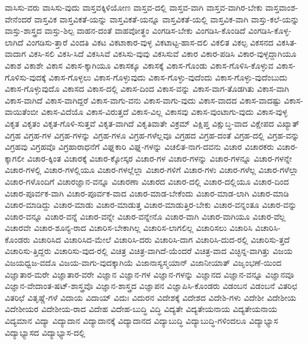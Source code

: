 {ವಾಸಿಸು-ವರು
ವಾಸಿಸು-ವುದು
ವಾಸ್ತವಕ್ಕಿಳಿಯೋಣ
ವಾಸ್ತವ-ದಲ್ಲಿ
ವಾಸ್ತವ-ವಾಗಿ
ವಾಸ್ತವ-ವಾಗಿರ-ಬೇಕು
ವಾಸ್ತವಾಂಶ-ವೇನೆಂದರೆ
ವಾಸ್ತವಿಕ
ವಾಸ್ತವಿಕತೆ-ಯನ್ನು
ವಾಸ್ತವಿಕತೆ-ಯನ್ನೂ
ವಾಸ್ತವಿಕತೆ-ಯಲ್ಲಿ
ವಾಸ್ತವಿಕ-ವಾಗಿ
ವಾಸ್ತು-ಕಲೆ-ಯನ್ನು
ವಾಸ್ತು-ಶಾಸ್ತ್ರದ
ವಾಸ್ತು-ಶಿಲ್ಪ
ವಾಹನ-ದಂತೆ
ವಾಹವೋತ್ಥಂ
ವಿಂಗಡಿಸ-ಬೇಕು
ವಿಂಗಡಿಸಿ-ಕೊಂಡಿದೆ
ವಿಂಗಡಿಸಿ-ಕೊಳ್ಳ-ಲಾಗಿದೆ
ವಿಂಗಡಿಸು-ತ್ತಾರೆ
ವಿಂದತಿ
ವಿಕಟ
ವಿಕಟಾಕಾರ-ವುಳ್ಳ
ವಿಕಟಾಟ್ಟ-ಹಾಸ-ದಲಿ
ವಿಕಲಿತ
ವಿಕಲ್ಪ
ವಿಕಸನದ
ವಿಕಸಿತ-ವಾದಾಗ
ವಿಕಸಿ-ಸಲಿ
ವಿಕಸಿ-ಸಿದೆ
ವಿಕಸಿಸಿವೆ
ವಿಕಸಿಸು-ವುವು
ವಿಕಸಿಸುವೆ
ವಿಕಾರ
ವಿಕಾರ-ಪಡಿಸಿ
ವಿಕಾರ-ವುಳ್ಳದ್ದಾಗಿಯೂ
ವಿಕಾಶ
ವಿಕಾಶೇ
ವಿಕಾಸ
ವಿಕಾಸ-ಕ್ಕಾಗಿಯೂ
ವಿಕಾಸಕ್ಕೂ
ವಿಕಾಸಕ್ಕೆ
ವಿಕಾಸ-ಗೊಂಡು
ವಿಕಾಸ-ಗೊಳಿಸಿ-ಕೊಳ್ಳುವ
ವಿಕಾಸ-ಗೊಳಿಸು-ವುದಕ್ಕೆ
ವಿಕಾಸ-ಗೊಳ್ಳಲು
ವಿಕಾಸ-ಗೊಳ್ಳುವುದು
ವಿಕಾಸ-ಗೊಳ್ಳು-ವುದೆಂದು
ವಿಕಾಸ-ಗೊಳ್ಳು-ವುದೆಂಬುದು
ವಿಕಾಸ-ಗೊಳ್ಳುವುದೊ
ವಿಕಾಸದ
ವಿಕಾಸ-ದಲ್ಲಿ
ವಿಕಾಸ-ದಿಂದ
ವಿಕಾಸ-ವನ್ನು
ವಿಕಾಸ-ವಾಗ-ತೊಡಗಿತು
ವಿಕಾಸ-ವಾಗಿ
ವಿಕಾಸ-ವಾಗಿದೆ
ವಿಕಾಸ-ವಾಗಿದ್ದರೆ
ವಿಕಾಸ-ವಾಗು-ವನು
ವಿಕಾಸ-ವಾಗು-ವುದು
ವಿಕಾಸ-ವಾದದ
ವಿಕಾಸ-ವಾದಷ್ಟು
ವಿಕಾಸ-ವಾಯಿತೆಂಬೀ
ವಿಕಾಸ-ವಿದೆಯೊ
ವಿಕಾಸ-ವಿರುತ್ತದೆ
ವಿಕಾಸ-ವಿಲ್ಲ
ವಿಕಾಸವು
ವಿಕಾಸ-ವುಂಟಾಗು-ವುದು
ವಿಕಾಸ-ವುಳ್ಳ
ವಿಕೃತ
ವಿಕೃತಂ
ವಿಕೃತ-ಗೊಳಿ-ಸುತ್ತವೆ
ವಿಕೃತ-ವಾಗಿದೆ
ವಿಕೃತಿವಾತೇ
ವಿಕ್ರಮ್
ವಿಕ್ಷಿಪ್ತ
ವಿಕ್ಷುಬ್ಧ-ವಾದ
ವಿಕ್ಷೇಪದ
ವಿಖ್ಯಾತ್
ವಿಗ್ರಹ
ವಿಗ್ರಹ-ಗಳ
ವಿಗ್ರಹ-ಗಳನ್ನು
ವಿಗ್ರಹ-ಗಳೂ
ವಿಗ್ರಹ-ಗಳೆಲ್ಲವೂ
ವಿಗ್ರಹದ
ವಿಗ್ರಹ-ದಂತೆ
ವಿಗ್ರಹ-ದಲ್ಲಿ
ವಿಗ್ರಹ-ವನ್ನು
ವಿಗ್ರಹವು
ವಿಗ್ರಹವೊ
ವಿಗ್ರಹಾರಾಧನೆಗೆ
ವಿಘ್ನಕಾರಿ
ವಿಘ್ನ-ಗಳನ್ನು
ವಿಚಲಿತ-ನಾಗ-ದವನು
ವಿಚಾರ
ವಿಚಾರಕರು
ವಿಚಾರ-ಕ್ಕಾಗಲೀ
ವಿಚಾರ-ಕ್ಕಿಂತ
ವಿಚಾರಕ್ಕೆ
ವಿಚಾರ-ಕ್ಕೋಸ್ಕರ
ವಿಚಾರ-ಗಳ
ವಿಚಾರ-ಗಳನ್ನು
ವಿಚಾರ-ಗಳನ್ನೂ
ವಿಚಾರ-ಗಳನ್ನೇ
ವಿಚಾರ-ಗಳಲ್ಲಿ
ವಿಚಾರ-ಗಳಲ್ಲಿಯೂ
ವಿಚಾರ-ಗಳಲ್ಲೆಲ್ಲಾ
ವಿಚಾರ-ಗಳಿಗೆ
ವಿಚಾರ-ಗಳು
ವಿಚಾರ-ಗಳೆಲ್ಲ
ವಿಚಾರ-ಗಳೆಲ್ಲಾ
ವಿಚಾರ-ಗಳೊಂದಿಗೆ
ವಿಚಾರಜ್ಞಾನ-ವನ್ನೂ
ವಿಚಾರಣಾ
ವಿಚಾರದ
ವಿಚಾರ-ದಲ್ಲಿ
ವಿಚಾರ-ದಲ್ಲಿಯೂ
ವಿಚಾರ-ದಿಂದ
ವಿಚಾರ-ಪೂರ್ವಕ-ವಾಗಿ
ವಿಚಾರ-ಪೂರ್ವಕ-ವಾದ
ವಿಚಾರ-ಮಾಡ-ಬೇಕೆಂದು
ವಿಚಾರ-ಮಾಡ-ಲಾಗಿ
ವಿಚಾರ-ಮಾಡಿ
ವಿಚಾರ-ಮಾಡಿದ್ದು
ವಿಚಾರ-ಮಾಡು
ವಿಚಾರ-ಮಾಡುತ್ತ
ವಿಚಾರ-ಮಾಡುತ್ತಿರ-ಬೇಕು
ವಿಚಾರ-ವನ್ನಂತೂ
ವಿಚಾರ-ವನ್ನು
ವಿಚಾರ-ವನ್ನೂ
ವಿಚಾರ-ವನ್ನೆ
ವಿಚಾರ-ವನ್ನೇ
ವಿಚಾರ-ವನ್ನೇನೊ
ವಿಚಾರ-ವಾಗಿ
ವಿಚಾರ-ವಾಗಿಯೂ
ವಿಚಾರ-ವೆಲ್ಲ
ವಿಚಾರವೇ
ವಿಚಾರ-ಶೂನ್ಯ-ರಾದ
ವಿಚಾರಿಸ-ಬೇಕಾಗಿಲ್ಲ
ವಿಚಾರಿಸ-ಲಾಗಲಿಲ್ಲ
ವಿಚಾರಿಸಲು
ವಿಚಾರಿಸಿ
ವಿಚಾರಿಸಿ-ಕೊಂಡರು
ವಿಚಾರಿಸಿದ
ವಿಚಾರಿಸಿದ-ಮೇಲೆ
ವಿಚಾರಿಸಿ-ದರು
ವಿಚಾರಿಸಿ-ದಾಗ
ವಿಚಾರಿಸಿ-ದುದ-ರಲ್ಲಿ
ವಿಚಾರಿಸು-ತ್ತದೆ
ವಿಚಾರಿಸು-ತ್ತಿದ್ದರು
ವಿಚಾರಿಸು-ವುದ-ರಲ್ಲಿ
ವಿಚಿತ್ರ
ವಿಚಿತ್ರ-ವಾಗಿದೆ-ಯೆಂದರೆ
ವಿಚಿತ್ರ-ವಾದ
ವಿಚ್ಛಿನ್ನ-ವಾಗಿತ್ತು
ವಿಜಯ
ವಿಜಯಧ್ವಜ-ವದೊ
ವಿಜಯ-ವಾಗು-ವುದಕ್ಕಾಗಿಯೆ
ವಿಜಾನಾಸ್ಯಸ್ಮಯಾನ್
ವಿಜಾನೀಯಾತ್
ವಿಜೃಂಭಣೆ-ಯಿಂದ
ವಿಜ್ಞಾತಾರ-ಮರೇ
ವಿಜ್ಞಾತಾರ-ವರೇ
ವಿಜ್ಞಾನ
ವಿಜ್ಞಾನ-ಗಳ
ವಿಜ್ಞಾನ-ಗಳನ್ನು
ವಿಜ್ಞಾನದ
ವಿಜ್ಞಾನ-ವನ್ನೂ
ವಿಜ್ಞಾನವೂ
ವಿಜ್ಞಾನ-ವೇದಾಂತ-ಷಟ್-ಶಾಸ್ತ್ರವೊ
ವಿಜ್ಞಾನ-ಶಾಸ್ತ್ರದ
ವಿಜ್ಞಾಪನ
ವಿಜ್ಞಾಪಿಸಿ-ಕೊಂಡರು
ವಿಡಂಬನ
ವಿಡಂಬನೆ
ವಿತರಿಛ
ವಿತರಿಛೆ
ವಿತೃಷ್ಣೆ-ಗಳೆ
ವಿದಾಯ
ವಿದಾಯ್
ವಿದುಃ
ವಿದುರನ
ವಿದೇಶಕ್ಕೆ
ವಿದೇಶದ
ವಿದೇಶಿ-ಗಳು
ವಿದೇಶೀ
ವಿದೇಶೀಯ
ವಿದೇಶೀಯರ
ವಿದೇಶೀಯ-ರಾದ
ವಿದೇಹ
ವಿದೇಹ-ಬುದ್ಧಿ
ವಿದ್ಧಿ
ವಿದ್ಯತೇ
ವಿದ್ಯತೇಯನಾಯ
ವಿದ್ಯತೇಯನಾಯ
ವಿದ್ಯಮಾನ
ವಿದ್ಯಾ
ವಿದ್ಯಾದಾನ
ವಿದ್ಯಾದಾನಕ್ಕೆ
ವಿದ್ಯಾದಾನದ
ವಿದ್ಯಾಬುದ್ಧಿ
ವಿದ್ಯಾಬುದ್ಧಿ-ಗಳಿಂದಲೂ
ವಿದ್ಯಾಭ್ಯಾಸ
ವಿದ್ಯಾಭ್ಯಾಸದ
ವಿದ್ಯಾಭ್ಯಾಸ-ದಲ್ಲಿ
}
